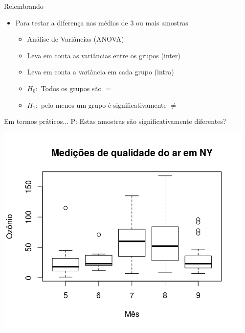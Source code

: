 \documentclass{beamer}
\begin{document}
\begin{frame}{\scriptsize Relembrando}
  \begin{itemize}
    \footnotesize
  \item Para testar a diferença nas médias de 3 ou mais amostras
    \begin{itemize}
      \scriptsize
    \item Análise de Variâncias (ANOVA)
      \bigskip
    \item Leva em conta as variâncias entre os grupos (\alert{inter})
    \item Leva em conta a variância em cada grupo (\alert{intra})
      \bigskip
    \item $H_0:$ Todos os grupos são $=$
      \bigskip
    \item $H_1:$ pelo menos um grupo é significativamente $\ne$
    \end{itemize}
  \end{itemize}
\end{frame}

\begin{frame}{\scriptsize Em termos práticos...}
  \footnotesize
P: Estas amostras são significativamente diferentes?

  \centering
  \includegraphics[height=.9\textheight]{Cap37-38/3samples-bp}
\end{frame}
\end{document}
